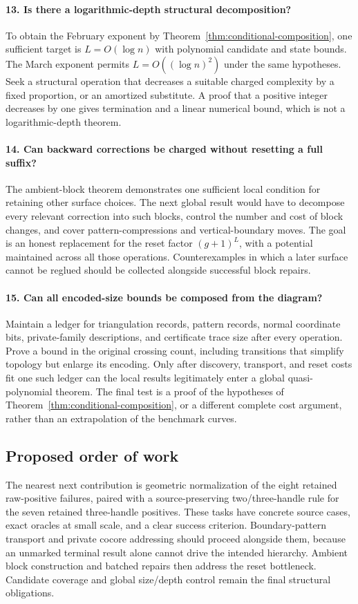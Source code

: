 \paragraph{13. Is there a logarithmic-depth structural decomposition?}
To obtain the February exponent by
Theorem~\ref{thm:conditional-composition}, one sufficient target is
$L=O(\log n)$ with polynomial candidate and state bounds.  The March
exponent permits $L=O((\log n)^2)$ under the same hypotheses.  Seek a
structural operation that decreases a suitable charged complexity by a
fixed proportion, or an amortized substitute.  A proof that a positive
integer decreases by one gives termination and a linear numerical bound,
which is not a logarithmic-depth theorem.

\paragraph{14. Can backward corrections be charged without resetting a full suffix?}
The ambient-block theorem demonstrates one sufficient local condition
for retaining other surface choices.  The next global result would have
to decompose every relevant correction into such blocks, control the
number and cost of block changes, and cover pattern-compressions and
vertical-boundary moves.  The goal is an honest replacement for the
reset factor $(g+1)^L$, with a potential maintained across all those
operations.  Counterexamples in which a later surface cannot be reglued
should be collected alongside successful block repairs.

\paragraph{15. Can all encoded-size bounds be composed from the diagram?}
Maintain a ledger for triangulation records, pattern records, normal
coordinate bits, private-family descriptions, and certificate trace size
after every operation.  Prove a bound in the original crossing count,
including transitions that simplify topology but enlarge its encoding.
Only after discovery, transport, and reset costs fit one such ledger can
the local results legitimately enter a global quasi-polynomial theorem.
The final test is a proof of the hypotheses of
Theorem~\ref{thm:conditional-composition}, or a different complete cost
argument, rather than an extrapolation of the benchmark curves.

\subsection{Proposed order of work}

The nearest next contribution is geometric normalization of the eight
retained raw-positive failures, paired with a source-preserving
two/three-handle rule for the seven retained three-handle positives.
These tasks have concrete source cases, exact oracles at small scale,
and a clear success criterion.  Boundary-pattern transport and private
cocore addressing should proceed alongside them, because an unmarked
terminal result alone cannot drive the intended hierarchy.  Ambient
block construction and batched repairs then address the reset bottleneck.
Candidate coverage and global size/depth control remain the final
structural obligations.

